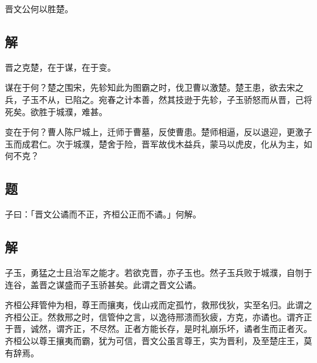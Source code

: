 \documentclass{article}
\begin{document}
晋文公何以胜楚。

\subsection*{解}

晋之克楚，在于谋，在于变。

谋在于何？楚之围宋，先轸知此为图霸之时，伐卫曹以激楚。楚王患，欲去宋之兵，子玉不从，已陷之。宛春之计本善，然其技逊于先轸，子玉骄怒而从晋，己将死矣。欲胜于城濮，难甚。

变在于何？曹人陈尸城上，迁师于曹墓，反使曹患。楚师相逼，反以退迎，更激子玉而成君仁。次于城濮，楚舍于险，晋军故伐木益兵，蒙马以虎皮，化从为主，如何不克？

\subsection*{题}

子曰：「晋文公谲而不正，齐桓公正而不谲。」何解。

\subsection*{解}

子玉，勇猛之士且治军之能才。若欲克晋，亦子玉也。然子玉兵败于城濮，自刎于连谷，盖晋之谋盛而子玉骄甚矣。此谓之晋文公谲。

齐桓公拜管仲为相，尊王而攘夷，伐山戎而定孤竹，救邢伐狄，实至名归。此谓之齐桓公正。然救邢之时，信管仲之言，以逸待邢溃而狄疲，方克，亦谲也。谓齐正于晋，诚然，谓齐正，不尽然。正者方能长存，是时礼崩乐坏，谲者生而正者灭。齐桓公以尊王攘夷而霸，犹为可信，晋文公虽言尊王，实为晋利，及至楚庄王，莫有辞焉。
\end{document}
